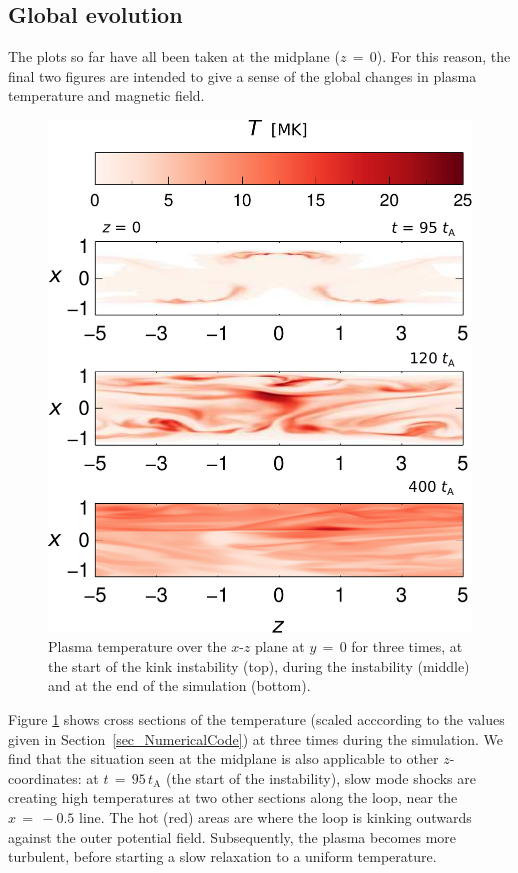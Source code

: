 \documentclass{./packages/rs/rsproca}
\begin{document}
\subsection{Global evolution}
\label{sec_NumericalResults_GlobalEvolution}

The plots so far have all been taken at the midplane ($z\,{=}\,0$). For this reason, the final two figures are intended to give a sense of the global changes in plasma temperature and magnetic field. 
\begin{figure}[h!]
  \center  
  \includegraphics[scale=0.38]{./inkscape/256x256x512/xz_temp_sca}
  \caption{\small{Plasma temperature over the $x$-$z$ plane at $y\,{=}\,0$ for three times, at the start of the kink instability (top), during the instability (middle) and at the end of the simulation (bottom).}}
  \label{xz_temp}
  \vspace{-10pt}
\end{figure}
Figure \ref{xz_temp} shows cross sections of the temperature (scaled acccording to the values given in \mbox{Section \ref{sec_NumericalCode}}) at three times during the simulation. We find that the situation seen at the midplane is also applicable to other $z$-coordinates: at $t\,{=}\,95\,t_{\mathrm{A}}$ (the start of the instability), slow mode shocks are creating high temperatures at two other sections along the loop, near the $x\,{=}\,-0.5$ line. The hot (red) areas are where the loop is kinking outwards against the outer potential field. Subsequently, the plasma becomes more turbulent, before starting a slow relaxation to a uniform temperature.
\end{document}
